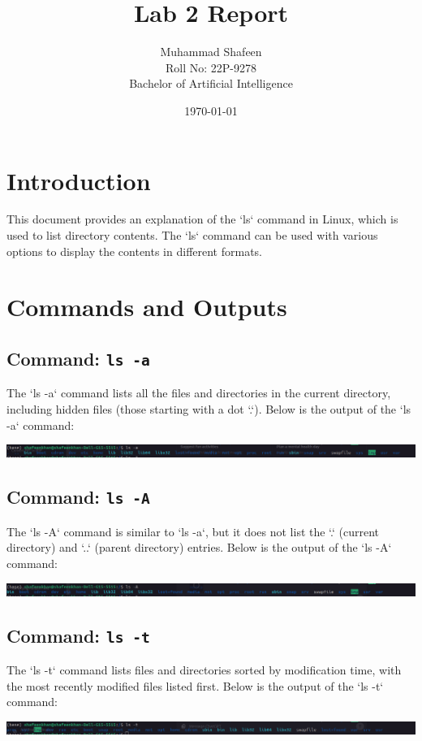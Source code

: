 \documentclass{article}
\title{Lab 2 Report}
\author{Muhammad Shafeen\\ Roll No: 22P-9278\\ Bachelor of Artificial Intelligence}
\date{\today}
\begin{document}
\maketitle

\section{Introduction}
This document provides an explanation of the `ls` command in Linux, which is used to list directory contents. The `ls` command can be used with various options to display the contents in different formats.

\section{Commands and Outputs}
\subsection{Command: \texttt{ls -a}}
The `ls -a` command lists all the files and directories in the current directory, including hidden files (those starting with a dot `.`). Below is the output of the `ls -a` command:
\begin{center}
    \includegraphics[width=\linewidth]{1.png}
\end{center}

\subsection{Command: \texttt{ls -A}}
The `ls -A` command is similar to `ls -a`, but it does not list the `.` (current directory) and `..` (parent directory) entries. Below is the output of the `ls -A` command:
\begin{center}
    \includegraphics[width=\linewidth]{2.png}
\end{center}

\subsection{Command: \texttt{ls -t}}
The `ls -t` command lists files and directories sorted by modification time, with the most recently modified files listed first. Below is the output of the `ls -t` command:
\begin{center}
    \includegraphics[width=\linewidth]{3.png}
\end{center}
\end{document}
